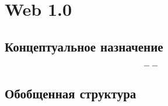 \chapter{Web 1.0}\label{ch:ch1}

\section{Концептуальное назначение}\label{sec:ch1/sec1}

\[
--
\]

\section{Обобщенная структура}\label{sec:ch1/sec2}

%
